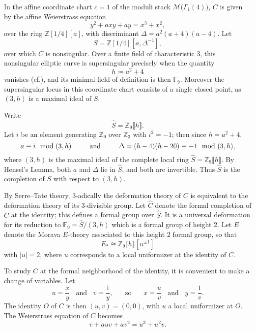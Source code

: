 \documentclass{gtpart}
\theoremstyle{definition}
\theoremstyle{remark}
\newcommand{\mb}[1]{\mathbb{#1}}
\newcommand{\cff}[2]{cf.\thinspace{\cite[#1]{#2}}}
\newcommand{\BF}{{\mb F}}
\newcommand{\BZ}{{\mb Z}}
\newcommand{\CM}{{\mathscr{M}}}
\newcommand{\HC}{\widehat{C}}
\newcommand{\HS}{\widehat{S}}
\newcommand{\md}{~~{\rm mod}~}
\newcommand{\G}{\Gamma}
\begin{document}
In the affine coordinate chart $c = 1$ of the moduli stack $\CM \big(\G_1(4)\big)$, 
$C$ is given by the affine Weierstrass equation 
\[
 y^2 + a x y + a y = x^3 + x^2, 
\]
over the ring $\BZ [1/4] [a]$, with discriminant $\Delta = a^2 (a + 4) (a - 4)$.  
Let 
\[
 S = \BZ [1/4] [a, \Delta^{-1}], 
\]
over which $C$ is nonsingular.  
Over a finite field of characteristic 3, this nonsingular elliptic curve is supersingular precisely when the quantity 
\begin{equation}
\label{h}
 h \coloneqq a^2 + 4 
\end{equation}
vanishes (\cff{V.4.1a}{AEC}), and its minimal field of definition is then $\BF_9$.  
Moreover the supersingular locus in this coordinate chart consists of a single closed point, as $(3,h)$ is a maximal ideal of $S$.  

Write 
\[
 \HS = \BZ_9 \llbracket h \rrbracket.  
\]
Let $i$ be an element generating $\BZ_9$ over $\BZ_3$ with $i^2 = -1$; then since $h = a^2 + 4$, 
\begin{equation}
\label{a}
 a \equiv i \md (3,h)~~~~~~~~\text{and}~~~~~~~~\Delta = (h - 4) (h - 20) \equiv -1 \md (3,h), 
\end{equation}
where $(3,h)$ is the maximal ideal of the complete local ring $\HS = \BZ_9 \llbracket h \rrbracket$.  
By Hensel's Lemma, both $a$ and $\Delta$ lie in $\HS$, and both are invertible.  
Thus $\HS$ is the completion of $S$ with respect to $(3,h)$.  

By Serre--Tate theory, 3-adically the deformation theory of $C$ is equivalent to the deformation theory of its 3-divisible group.  
Let $\HC$ denote the formal completion of $C$ at the identity; this defines a formal group over $\HS$.  
It is a universal deformation for its reduction to $\BF_9 = \HS / (3,h)$ which is a formal group of height 2.  
Let $E$ denote the Morava $E$-theory associated to this height 2 formal group, 
so that 
\[
 E_* \cong \BZ_9 \llbracket h \rrbracket [u^{\pm 1}] 
\]
with $|u| = 2$, where $u$ corresponds to a local uniformizer at the identity of $C$.  

To study $C$ at the formal neighborhood of the identity, it is convenient to make a change of variables.  
Let 
\[
 u = \frac{x}{y}~~~~\text{and}~~~~v = \frac{1}{y},~~~~~~~~\text{so}~~~~~~~~x = \frac{u}{v}~~~~\text{and}~~~~y = \frac{1}{v}.  
\]
The identity $O$ of $C$ is then $(u,v) = (0,0)$, with $u$ a local uniformizer at $O$.  
The Weierstrass equation of $C$ becomes 
\begin{equation}
\label{nf}
 v + a u v + a v^2 = u^3 + u^2 v.  
\end{equation}
\end{document}
